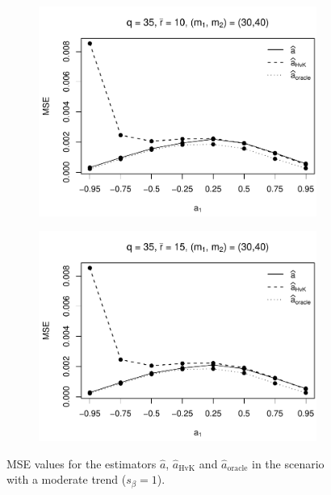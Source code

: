 \begin{figure}[h!]
\begin{subfigure}[b]{0.45\textwidth}
\includegraphics[width=\textwidth]{Plots/Robustness/MSE_a1_T=500_slope=1_(q,K1,K2,M1,M2)=(35,2,10,30,40).pdf}
\end{subfigure}
\hspace{0.25cm}
\begin{subfigure}[b]{0.45\textwidth}
\includegraphics[width=\textwidth]{Plots/Robustness/MSE_a1_T=500_slope=1_(q,K1,K2,M1,M2)=(35,2,15,30,40).pdf}
\end{subfigure}
\caption{MSE values for the estimators $\widehat{a}$, $\widehat{a}_{\text{HvK}}$ and $\widehat{a}_{\text{oracle}}$ in the scenario with a moderate trend ($s_\beta=1$).}\label{fig:MSE_slope1_AR_robust} 
\end{figure}


